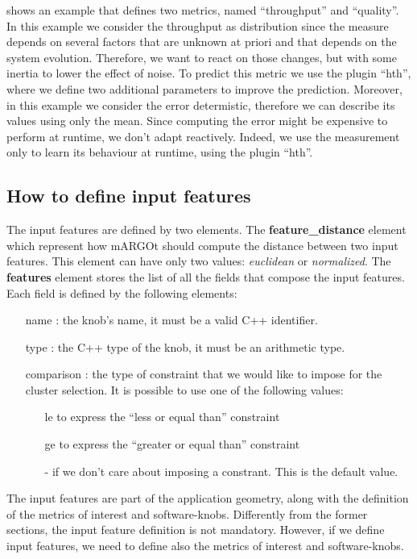 shows an example that defines two metrics, named ``throughput'' and ``quality''.
In this example we consider the throughput as distribution since the measure depends on several factors that are unknown at priori and that depends on the system evolution.
Therefore, we want to react on those changes, but with some inertia to lower the effect of noise.
To predict this metric we use the plugin ``hth'', where we define two additional parameters to improve the prediction.
Moreover, in this example we consider the error determistic, therefore we can describe its values using only the mean.
Since computing the error might be expensive to perform at runtime, we don't adapt reactively.
Indeed, we use the measurement only to learn its behaviour at runtime, using the plugin ``hth''.




\subsection{How to define input features}
\label{ssec:feature_element}


The input features are defined by two elements.
The \textbf{feature\_distance} element which represent how mARGOt should compute the distance between two input features.
This element can have only two values: \textit{euclidean} or \textit{normalized}.
The \textbf{features} element stores the list of all the fields that compose the input features.
Each field is defined by the following elements:
\begin{itemize}
	\item[name]: the knob's name, it must be a valid C++ identifier.
	\item[type]: the C++ type of the knob, it must be an arithmetic type.
	\item[comparison]: the type of constraint that we would like to impose for the cluster selection. It is possible to use one of the following values:
	\begin{itemize}
		\item[le] to express the ``less or equal than'' constraint
		\item[ge] to express the ``greater or equal than'' constraint
		\item[-] if we don't care about imposing a constrant. This is the default value.
	\end{itemize}
\end{itemize}

The input features are part of the application geometry, along with the definition of the metrics of interest and software-knobs.
Differently from the former sections, the input feature definition is not mandatory.
However, if we define input features, we need to define also the metrics of interest and software-knobs.




